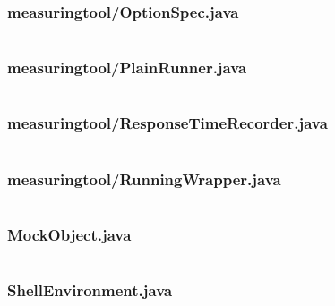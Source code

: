 \documentclass[a4paper,12pt]{article}
\begin{document}
\subsubsection{measuringtool/OptionSpec.java}
\inputminted[fontsize=\small, linenos, numbersep=5pt, tabsize=4, frame=topline,framesep=0.8cm]{java}{/home/tituomin/StudioProjects/nativebenchmark/src/fi/helsinki/cs/tituomin/nativebenchmark/measuringtool/OptionSpec.java}
\vspace{1cm}
\subsubsection{measuringtool/PlainRunner.java}
\inputminted[fontsize=\small, linenos, numbersep=5pt, tabsize=4, frame=topline,framesep=0.8cm]{java}{/home/tituomin/StudioProjects/nativebenchmark/src/fi/helsinki/cs/tituomin/nativebenchmark/measuringtool/PlainRunner.java}
\vspace{1cm}
\subsubsection{measuringtool/ResponseTimeRecorder.java}
\inputminted[fontsize=\small, linenos, numbersep=5pt, tabsize=4, frame=topline,framesep=0.8cm]{java}{/home/tituomin/StudioProjects/nativebenchmark/src/fi/helsinki/cs/tituomin/nativebenchmark/measuringtool/ResponseTimeRecorder.java}
\vspace{1cm}
\subsubsection{measuringtool/RunningWrapper.java}
\inputminted[fontsize=\small, linenos, numbersep=5pt, tabsize=4, frame=topline,framesep=0.8cm]{java}{/home/tituomin/StudioProjects/nativebenchmark/src/fi/helsinki/cs/tituomin/nativebenchmark/measuringtool/RunningWrapper.java}
\vspace{1cm}
\subsubsection{MockObject.java}
\inputminted[fontsize=\small, linenos, numbersep=5pt, tabsize=4, frame=topline,framesep=0.8cm]{java}{/home/tituomin/StudioProjects/nativebenchmark/src/fi/helsinki/cs/tituomin/nativebenchmark/MockObject.java}
\vspace{1cm}
\subsubsection{ShellEnvironment.java}
\inputminted[fontsize=\small, linenos, numbersep=5pt, tabsize=4, frame=topline,framesep=0.8cm]{java}{/home/tituomin/StudioProjects/nativebenchmark/src/fi/helsinki/cs/tituomin/nativebenchmark/ShellEnvironment.java}
\vspace{1cm}
\end{document}
